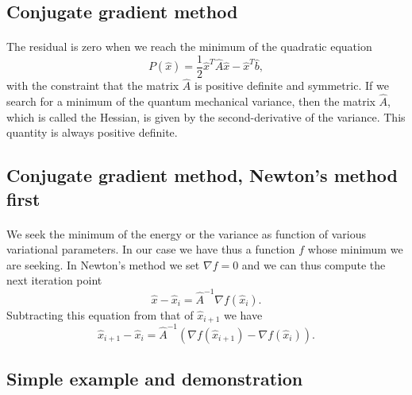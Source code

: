\documentclass[%
twoside,                 %
final,                   %
10pt]{article}
\begin{document}
\subsection*{Conjugate gradient method}

\paragraph{}

The residual is zero when we reach the minimum of the quadratic equation
\begin{equation*}
  P(\hat{x})=\frac{1}{2}\hat{x}^T\hat{A}\hat{x} - \hat{x}^T\hat{b},
\end{equation*}
with the constraint that the matrix $\hat{A}$ is positive definite and symmetric.
If we search for a minimum of the quantum mechanical  variance, then the matrix 
$\hat{A}$, which is called the Hessian, is given by the second-derivative of the variance.  This quantity is always positive definite.







\subsection*{Conjugate gradient method, Newton's method first}

\paragraph{}
We seek the minimum of the energy or the variance as function of various variational parameters. 
In our case we have thus a function $f$ whose minimum we are seeking.
In Newton's method we set $\nabla f = 0$ and we can thus compute the next iteration point
\begin{equation*}
\hat{x}-\hat{x}_i=\hat{A}^{-1}\nabla f(\hat{x}_i).
\end{equation*}
Subtracting this equation from that of $\hat{x}_{i+1}$ we have
\begin{equation*}
\hat{x}_{i+1}-\hat{x}_i=\hat{A}^{-1}(\nabla f(\hat{x}_{i+1})-\nabla f(\hat{x}_i)).
\end{equation*}



\subsection*{Simple example and demonstration}
\end{document}
